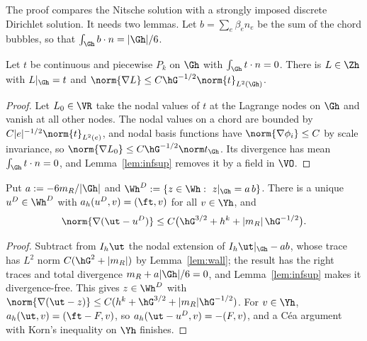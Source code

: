 The proof compares the Nitsche solution with a strongly imposed discrete Dirichlet solution. It needs two lemmas. Let $b=\sum_e\beta_en_e$ be the sum of the chord bubbles, so that $\int_{\Gh}b\cdot n=|\Gh|/6$.

\begin{lemma}\label{lem:lift}
Let $t$ be continuous and piecewise $P_k$ on $\Gh$ with $\int_{\Gh}t\cdot n=0$. There is $L\in\Zh$ with $L|_{\Gh}=t$ and $\norm{\nabla L}\le C\hG^{-1/2}\norm{t}_{L^2(\Gh)}$.
\end{lemma}

\begin{proof}
Let $L_0\in\VR$ take the nodal values of $t$ at the Lagrange nodes on $\Gh$ and vanish at all other nodes. The nodal values on a chord are bounded by $C|e|^{-1/2}\norm{t}_{L^2(e)}$, and nodal basis functions have $\norm{\nabla\phi_i}\le C$ by scale invariance, so $\norm{\nabla L_0}\le C\hG^{-1/2}\norm t_{\Gh}$. Its divergence has mean $\int_{\Gh}t\cdot n=0$, and Lemma~\ref{lem:infsup} removes it by a field in $\VO$.
\end{proof}

\begin{lemma}\label{lem:dir}
Put $a:=-6m_R/|\Gh|$ and $\Wh^D:=\{z\in\Wh:\ z|_{\Gh}=a\,b\}$. There is a unique $u^D\in\Wh^D$ with $a_h(u^D,v)=(\ft,v)$ for all $v\in\Yh$, and
\[
\norm{\nabla(\ut-u^D)}\le C\bigl(\hG^{3/2}+h^k+|m_R|\,\hG^{-1/2}\bigr).
\]
\end{lemma}

\begin{proof}
Subtract from $I_h\ut$ the nodal extension of $I_h\ut|_{\Gh}-ab$, whose trace has $L^2$ norm $C(\hG^2+|m_R|)$ by Lemma~\ref{lem:wall}; the result has the right traces and total divergence $m_R+a|\Gh|/6=0$, and Lemma~\ref{lem:infsup} makes it divergence-free. This gives $z\in\Wh^D$ with $\norm{\nabla(\ut-z)}\le C(h^k+\hG^{3/2}+|m_R|\hG^{-1/2})$. For $v\in\Yh$, $a_h(\ut,v)=(\ft-F,v)$, so $a_h(\ut-u^D,v)=-(F,v)$, and a C\'ea argument with Korn's inequality on $\Yh$ finishes.
\end{proof}


